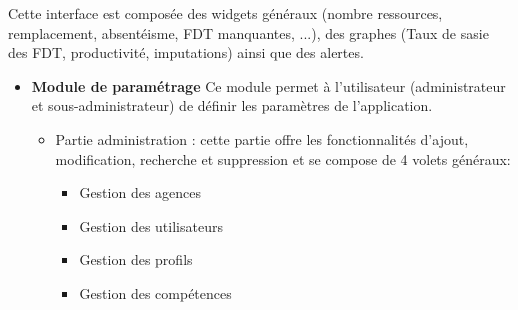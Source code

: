 Cette interface est composée des widgets généraux (nombre ressources, remplacement, absentéisme, FDT manquantes, ...), des graphes (Taux de sasie des FDT, productivité, imputations) ainsi que des alertes.\\
\begin{itemize}[label=\textbullet]
	\item \textbf{Module de paramétrage}
	Ce module permet à l'utilisateur (administrateur et sous-administrateur) de définir les paramètres de l’application.

	\begin{itemize}[label=\textbullet]
	\item Partie administration : cette partie offre les fonctionnalités d'ajout, modification, recherche et suppression et se compose de 4 volets généraux:
	\begin{itemize}
	\item Gestion des agences 
      	\item Gestion des utilisateurs 
     	 \item Gestion des profils 
      	\item Gestion des compétences 
	\end{itemize}
	\end{itemize}
	\newpage

\end{itemize}
